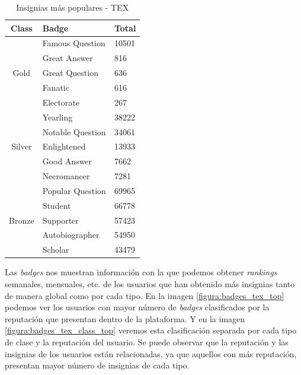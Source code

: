 \documentclass[a4paper, 12pt]{book}
\begin{document}
\begin{table}[ht]
    \begin{center}
        \begin{tabular}{ c  l  l  }
        \hline
          \textbf{Class} & \textbf{Badge} & \textbf{Total} \\ \hline
            \multirow{5}{*}{Gold} & Famous Question & 10501 \\ 
            & Great Answer & 816 \\
            & Great Question & 636 \\
            & Fanatic & 616  \\ 
            & Electorate & 267 \\ 
            \hline
            \multirow{5}{*}{Silver} & Yearling & 38222 \\ 
            & Notable Question & 34061 \\
            & Enlightened & 13933 \\
            & Good Answer & 7662  \\ 
            & Necromancer & 7281 \\ 
            \hline
            \multirow{5}{*}{Bronze} & Popular Question & 69965 \\ 
            & Student & 66778 \\
            & Supporter & 57423 \\
            & Autobiographer & 54950 \\ 
            & Scholar & 43479 \\ 
        \end{tabular}
        \caption{Insignias más populares - TEX}
        \label{tab:top_5_tags_tex}
    \end{center}
\end{table}


Las \emph{badges} nos muestran información con la que podemos obtener \emph{rankings} semanales, mensuales, etc. de los usuarios que han obtenido más insignias tanto de manera global como por cada tipo. 
En la imagen \ref{figura:badges_tex_top} podemos ver los usuarios con mayor número de \emph{badges} clasificados por la reputación que presentan dentro de la plataforma. Y en la imagen \ref{figura:badges_tex_class_top} veremos esta clasificación separada por cada tipo de clase y la reputación del usuario.
Se puede observar que la reputación y las insignias de los usuarios están relacionadas, ya que aquellos con más reputación, presentan mayor número de insignias de cada tipo. 
\end{document}
